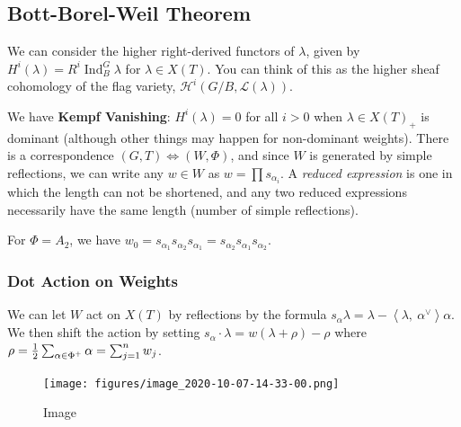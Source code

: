 \hypertarget{bott-borel-weil-theorem}{%
\subsection{Bott-Borel-Weil Theorem}\label{bott-borel-weil-theorem}}

We can consider the higher right-derived functors of \(\lambda\), given
by \(H^i(\lambda) = R^i \operatorname{Ind}_B^G \lambda\) for
\(\lambda \in X(T)\). You can think of this as the higher sheaf
cohomology of the flag variety,
\(\mathcal{H}^i(G/B, \mathcal{L}(\lambda))\).

We have \textbf{Kempf Vanishing}: \(H^i(\lambda) = 0\) for all \(i>0\)
when \(\lambda \in X(T)_+\) is dominant (although other things may
happen for non-dominant weights). There is a correspondence
\((G, T) \iff (W, \Phi)\), and since \(W\) is generated by simple
reflections, we can write any \(w\in W\) as \(w=\prod s_{\alpha_i}\). A
\emph{reduced expression} is one in which the length can not be
shortened, and any two reduced expressions necessarily have the same
length (number of simple reflections).

\begin{example}

For \(\Phi = A_2\), we have
\(w_0 = s_{\alpha_1} s_{\alpha_2} s_{\alpha_1} = s_{\alpha_2} s_{\alpha_1} s_{\alpha_2}\).

\end{example}

\hypertarget{dot-action-on-weights}{%
\subsubsection{Dot Action on Weights}\label{dot-action-on-weights}}

We can let \(W\) act on \(X(T)\) by reflections by the formula
\(s_\alpha \lambda = \lambda - {\left\langle {\lambda},~{\alpha^\vee} \right\rangle}\alpha\).
We then shift the action by setting
\(s_\alpha \cdot \lambda = w(\lambda+\rho)-\rho\) where
\(\rho = {1\over 2} \sum_{\alpha\in \Phi^+} \alpha = \sum_{j=1}^n w_j\).

\begin{figure}
\centering
\texttt{[image: figures/image\_2020-10-07-14-33-00.png]}
\caption{Image}
\end{figure}

